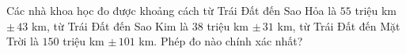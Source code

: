 \begin{ex}
Các nhà khoa học đo được khoảng cách từ Trái Đất đến Sao Hỏa là $55$ triệu km $\pm\,43$ km, từ Trái Đất đến Sao Kim là $38$ triệu km $\pm\,31$ km, từ Trái Đất đến Mặt Trời là $150$ triệu km $\pm\,101$ km. Phép đo nào chính xác nhất?
\end{ex}
